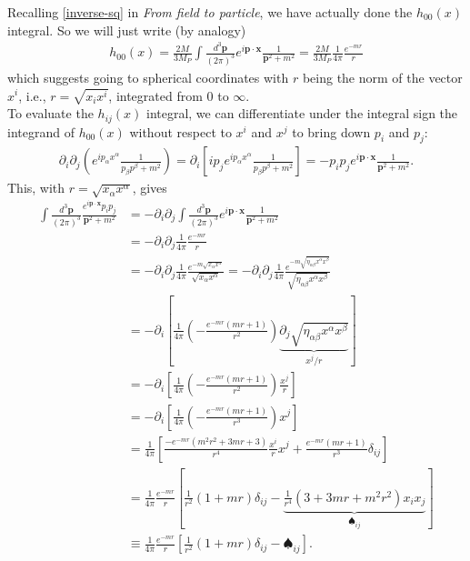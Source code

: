 \documentclass{book}
\theoremstyle{definition}
\newcommand{\p}{\partial}
\newcommand{\nn}{\nonumber}
\newcommand{\f}[2]{\frac{#1}{#2}}
\newcommand{\lp}{\left(}
\newcommand{\rp}{\right)}
\newcommand{\lb}{\left[}
\newcommand{\rb}{\right]}
\begin{document}
Recalling \eqref{inverse-sq} in \textit{From field to particle}, we have actually done the $h_{00}(x)$ integral. So we will just write (by analogy)
\begin{align}
{h_{00}(x) = \f{2M}{3M_P}\int \f{d^3\mathbf{p}}{(2\pi)^3}e^{i\mathbf{p}\cdot \mathbf{x}}\f{1}{\mathbf{p}^2 + m^2}= \f{2M}{3M_P}\f{1}{4\pi}\f{e^{-mr}}{r}}
\end{align}
which suggests going to spherical coordinates with $r$ being the norm of the vector $x^i$, i.e., $r = \sqrt{x_ix^i}$, integrated from $0$ to $\infty$. \\

To evaluate the $h_{ij}(x)$ integral, we can differentiate under the integral sign the integrand of $h_00(x)$ without respect to $x^i$ and $x^j$ to bring down $p_i$ and $p_j$:
\begin{align}
\p_i \p_j \lp e^{i p_\alpha x^\alpha} \f{1}{p_\beta p^\beta + m^2}\rp  =  \p_i \lb i p_j e^{i p_\alpha x^\alpha} \f{1}{p_\beta p^\beta + m^2}\rb=  -p_ip_j e^{i\mathbf{p}\cdot \mathbf{x}}\f{1}{\mathbf{p}^2 + m^2}.
\end{align} 
This, with $r = \sqrt{x_\alpha x^\alpha}$, gives
\begin{align}
\int \f{d^3\mathbf{p}}{(2\pi)^3}\f{e^{i\mathbf{p}\cdot \mathbf{x}} p_i p_j}{\mathbf{p}^2 + m^2} &= -\p_i\p_j \int \f{d^3\mathbf{p}}{(2\pi)^3}e^{i\mathbf{p}\cdot \mathbf{x}}\f{1}{\mathbf{p}^2 + m^2} \nn\\
&= -\p_i \p_j \f{1}{4\pi}\f{e^{-mr}}{r} \nn\\
&= -\p_i \p_j \f{1}{4\pi}\f{e^{-m\sqrt{x_\alpha x^\alpha}}}{\sqrt{x_\alpha x^\alpha}} = -\p_i \p_j \f{1}{4\pi}\f{e^{-m\sqrt{\eta_{\alpha\beta}x^\alpha x^\beta}}}{\sqrt{\eta_{\alpha\beta}x^\alpha x^\beta}}\nn\\
&= -\p_i \lb \f{1}{4\pi} \lp -\frac{e^{-m r} (m r+1)}{r^2} \rp \underbrace{\p_j \sqrt{\eta_{\alpha\beta}x^\alpha x^\beta}}_{x^j/r}   \rb\nn\\
&= -\p_i \lb \f{1}{4\pi} \lp -\frac{e^{-m r} (m r+1)}{r^2} \rp \f{x^j}{r}  \rb\nn\\
&= -\p_i \lb \f{1}{4\pi} \lp -\frac{e^{-m r} (m r+1)}{r^3} \rp x^j  \rb\nn\\
&= \f{1}{4\pi}\lb  \frac{-e^{-m r} \left(m^2 r^2+3 m r+3\right)}{r^4}  \f{x^i}{r} x^j +  \frac{e^{-m r} (m r+1)}{r^3}  \delta_{ij} \rb\nn\\
&= \f{1}{4\pi}\f{e^{-mr}}{r}\lb \f{1}{r^2}(1+mr)\delta_{ij} - \underbrace{\f{1}{r^4}(3+3mr + m^2r^2)x_ix_j}_{\spadesuit_{ij}}\rb\nn\\
&\equiv \f{1}{4\pi}\f{e^{-mr}}{r}\lb \f{1}{r^2}(1+mr)\delta_{ij} - \spadesuit_{ij}\rb.
\end{align}
\end{document}

